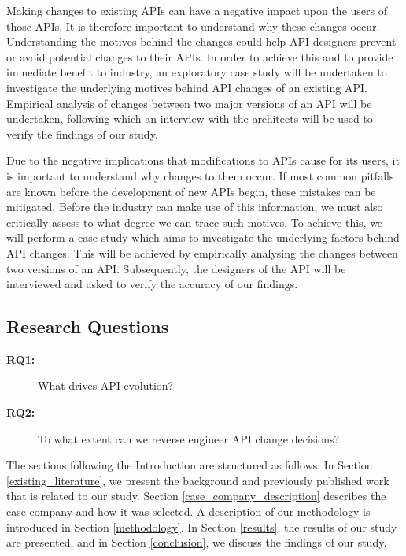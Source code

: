 \documentclass[conference]{IEEEtran}
\begin{document}
Making changes to existing APIs can have a negative impact upon the users of those APIs. It is therefore important to understand why these changes occur. Understanding the motives behind the changes could help API designers prevent or avoid potential changes to their APIs. In order to achieve this and to provide immediate benefit to industry, an exploratory case study will be undertaken to investigate the underlying motives behind API changes of an existing API. Empirical analysis of changes between two major versions of an API will be undertaken, following which an interview with the architects will be used to verify the findings of our study. 

Due to the negative implications that modifications to APIs cause for its users, it is important to understand why changes to them occur. If most common pitfalls are known before the development of new APIs begin, these mistakes can be mitigated. Before the industry can make use of this information, we must also critically assess to what degree we can trace such motives. To achieve this, we will perform a case study which aims to investigate the underlying factors behind API changes. This will be achieved by empirically analysing the changes between two versions of an API. Subsequently, the designers of the API will be interviewed and asked to verify the accuracy of our findings. 


\subsection{Research Questions} \label{rqs}
\begin{description}
\item[\textbf{RQ1:}] What drives API evolution?
\item[\textbf{RQ2:}] To what extent can we reverse engineer API change decisions?
\end{description}

The sections following the Introduction are structured as follows: In Section \ref{existing_literature}, we present the background and previously published work that is related to our study. Section \ref{case_company_description} describes the case company and how it was selected. A description of our methodology is introduced in Section \ref{methodology}. In Section \ref{results}, the results of our study are presented, and in Section \ref{conclusion}, we discuss the findings of our study.
\end{document}
